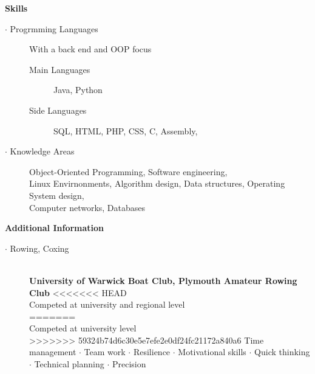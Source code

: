 \documentclass[12pt]{article}
\begin{document}
\textbf{Skills}
  \begin{description}
    \item[$\cdot$ Progrmming Languages] With a back end and OOP focus
    \begin{description}
      \item[Main Languages] Java, Python
      \item[Side Languages] SQL, HTML, PHP, CSS, C, Assembly,
    \end{description}
    \item[$\cdot$ Knowledge Areas]Object-Oriented Programming, Software engineering, \\Linux Envirnonments, Algorithm design, Data structures, Operating System design, \\Computer networks, Databases
  \end{description}
\bigskip

  \textbf{Additional Information}
    \begin{description}
      \item[$\cdot$ Rowing, Coxing] \textbf{\\University of Warwick Boat Club, Plymouth Amateur Rowing Club}
<<<<<<< HEAD
      \\ Competed at university and regional level \\
=======
      \\ Competed at university level \\
>>>>>>> 59324b74d6c30e5e7efe2e0df24fc21172a840a6
      Time management $\cdot$ Team work $\cdot$ Resilience $\cdot$ Motivational skills $\cdot$ Quick thinking \\ $\cdot$ Technical planning $\cdot$ Precision
      \iffalse
      The sport of rowing requires time commitement, hard work, and team work. Rowing demands reaching one's physical limit only to push past it, working together to achieve the best you can. Coxing teaches quick thinking, motivational skills, and technical planning.
      \fi
    \end{description}
\end{document}
